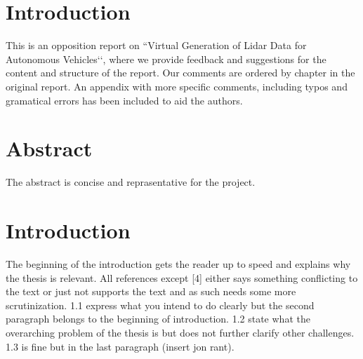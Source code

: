 \documentclass[12pt,a4paper,twoside,openright]{report}
\begin{document}
 


\newcommand{\varHeadline}{Opponering av DATX02-17-10}
\newcommand{\varSubtitle}{Av DATX02-17-12}
\newcommand{\varDepartment}{Department of Computer Science and Engineering}
\newcommand{\varNames}{André Perzon, Björn Strömberg, Chi Thong Luong,  \\
Elias Forsberg, Jesper Åberg, Jon Johnsson}




\section*{Introduction}
	
	This is an opposition report on ``Virtual Generation of Lidar Data for
	Autonomous Vehicles‘‘, where we provide feedback and suggestions for the
	content and structure of the report. Our comments are ordered by chapter in
	the original report. An appendix with more specific comments, including
	typos and gramatical errors has been included to aid the authors.

\section*{Abstract}

	The abstract is concise and reprasentative for the project.

\section*{Introduction}

	The beginning of the introduction gets the reader up to speed and explains
	why the thesis is relevant. All references except [4] either says something
	conflicting to the text or just not supports the text and as such needs
	some more scrutinization. 1.1 express what you intend to do clearly but the
	second paragraph belongs to the beginning of introduction. 1.2 state what
	the overarching problem of the thesis is but does not further clarify other
	challenges. 1.3 is fine but in the last paragraph (insert jon rant).
\end{document}
